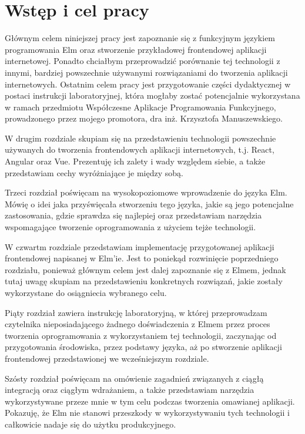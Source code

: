 \documentclass[twoside,a4paper]{report}
\begin{document}

\chapter{Wstęp i cel pracy}
Głównym celem niniejszej pracy jest zapoznanie się z funkcyjnym językiem programowania Elm oraz stworzenie przykładowej frontendowej aplikacji internetowej.
Ponadto chciałbym przeprowadzić porównanie tej technologii z innymi, bardziej powszechnie używanymi rozwiązaniami do tworzenia aplikacji internetowych.
Ostatnim celem pracy jest przygotowanie części dydaktycznej w postaci instrukcji laboratoryjnej, która mogłaby zostać potencjalnie wykorzystana w ramach przedmiotu Współczesne Aplikacje Programowania Funkcyjnego, prowadzonego przez mojego promotora, dra inż. Krzysztofa Manuszewskiego.

W drugim rozdziale skupiam się na przedstawieniu technologii powszechnie używanych do tworzenia frontendowych aplikacji internetowych, t.j. React, Angular oraz Vue.
Prezentuję ich zalety i wady względem siebie, a także przedstawiam cechy wyróżniające je między sobą.

Trzeci rozdział poświęcam na wysokopoziomowe wprowadzenie do języka Elm. Mówię o idei jaka przyświęcała stworzeniu tego języka, jakie są jego potencjalne zastosowania, gdzie sprawdza się najlepiej oraz przedstawiam narzędzia wspomagające tworzenie oprogramowania z użyciem tejże technologii.

W czwartm rozdziale przedstawiam implementację przygotowanej aplikacji frontendowej napisanej w Elm'ie. Jest to poniekąd rozwinięcie poprzedniego rozdziału, ponieważ głównym celem jest dalej zapoznanie się z Elmem, jednak tutaj uwagę skupiam na przedstawieniu konkretnych rozwiązań, jakie zostały wykorzystane do osiągniecia wybranego celu.

Piąty rozdział zawiera instrukcję laboratoryjną, w której przeprowadzam czytelnika nieposiadającego żadnego doświadczenia z Elmem przez proces tworzenia oprogramowania z wykorzystaniem tej technologii, zaczynając od przygotowania środowiska, przez podstawy języka, aż po stworzenie aplikacji frontendowej przedstawionej we wcześniejszym rozdziale.

Szósty rozdział poświęcam na omówienie zagadnień związanych z ciągłą integracją oraz ciągłym wdrażaniem, a także przedstawiam narzędzia wykorzystywane przeze mnie w tym celu podczas tworzenia omawianej aplikacji. Pokazuję, że Elm nie stanowi przeszkody w wykorzystywaniu tych technologii i całkowicie nadaje się do użytku produkcyjnego.
\end{document}
